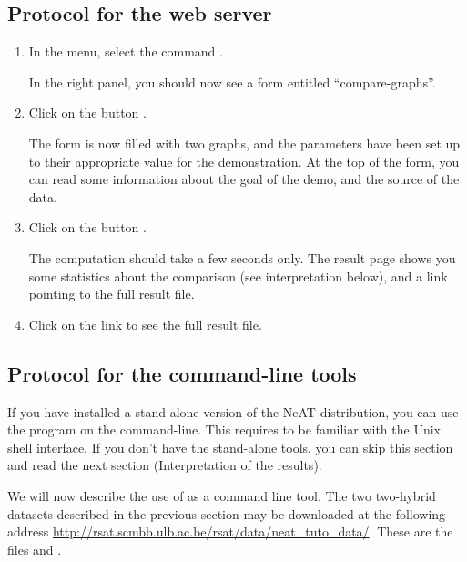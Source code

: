 \subsection{Protocol for the web server}

\begin{enumerate}

\item In the \neat menu, select the command . 

  In the right panel, you should now see a form entitled
  ``compare-graphs''.

\item Click on the button . 

  The form is now filled with two graphs, and the parameters have been
  set up to their appropriate value for the demonstration. At the top
  of the form, you can read some information about the goal of the
  demo, and the source of the data.

\item Click on the button . 

  The computation should take a few seconds only. The result page
  shows you some statistics about the comparison (see interpretation
  below), and a link pointing to the full result file. 

\item Click on the link to see the full result file. 


\end{enumerate}

\subsection{Protocol for the command-line tools}

If you have installed a stand-alone version of the NeAT distribution,
you can use the program  on the
command-line. This requires to be familiar with the Unix shell
interface. If you don't have the stand-alone tools, you can skip this
section and read the next section (Interpretation of the results).

We will now describe the use of  as a command line tool. 
The two two-hybrid datasets described
in the previous section may be downloaded at the following address \url{http://rsat.scmbb.ulb.ac.be/rsat/data/neat\_tuto\_data/}. 
These are the files  and .

